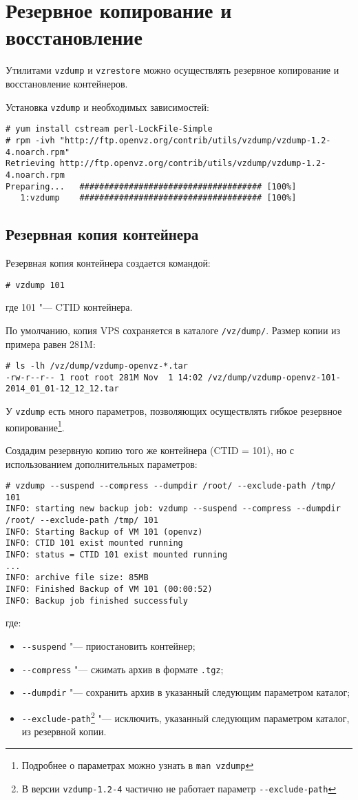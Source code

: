 \section{Резервное копирование и восстановление}

Утилитами \texttt{vzdump} и \texttt{vzrestore} можно осуществлять резервное копирование и восстановление контейнеров.

Установка \texttt{vzdump} и необходимых зависимостей:
\begin{lstlisting}
# yum install cstream perl-LockFile-Simple
# rpm -ivh "http://ftp.openvz.org/contrib/utils/vzdump/vzdump-1.2-4.noarch.rpm"
Retrieving http://ftp.openvz.org/contrib/utils/vzdump/vzdump-1.2-4.noarch.rpm
Preparing...   ##################################### [100%]
   1:vzdump    ##################################### [100%]
\end{lstlisting}

\subsection{Резервная копия контейнера}
Резервная копия контейнера создается командой:
\begin{lstlisting}
# vzdump 101
\end{lstlisting}
где 101 "--- CTID контейнера.

По умолчанию, копия VPS сохраняется в каталоге \texttt{/vz/dump/}. Размер копии из примера равен 281M:
\begin{lstlisting}
# ls -lh /vz/dump/vzdump-openvz-*.tar 
-rw-r--r-- 1 root root 281M Nov  1 14:02 /vz/dump/vzdump-openvz-101-2014_01_01-12_12_12.tar
\end{lstlisting}

У \texttt{vzdump} есть много параметров, позволяющих осуществлять гибкое резервное копирование\footnote{Подробнее о параметрах можно узнать в \texttt{man vzdump}}.

Создадим резервную копию того же контейнера (CTID = 101), но с использованием дополнительных параметров:
\begin{lstlisting}
# vzdump --suspend --compress --dumpdir /root/ --exclude-path /tmp/ 101
INFO: starting new backup job: vzdump --suspend --compress --dumpdir /root/ --exclude-path /tmp/ 101
INFO: Starting Backup of VM 101 (openvz)
INFO: CTID 101 exist mounted running
INFO: status = CTID 101 exist mounted running
...
INFO: archive file size: 85MB
INFO: Finished Backup of VM 101 (00:00:52)
INFO: Backup job finished successfuly
\end{lstlisting}
где:
\begin{itemize}
    \item \texttt{-{}-suspend} "--- приостановить контейнер;
    \item \texttt{-{}-compress} "--- сжимать архив в формате \texttt{.tgz};
    \item \texttt{-{}-dumpdir} "--- сохранить архив в указанный следующим параметром каталог;
    \item \texttt{-{}-exclude-path}\footnote{В версии \texttt{vzdump-1.2-4} частично не работает параметр \texttt{-{}-exclude-path}} "--- исключить, указанный следующим параметром каталог, из резервной копии.
\end{itemize}

